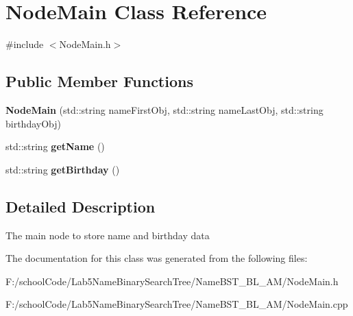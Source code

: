 \hypertarget{class_node_main}{}\section{Node\+Main Class Reference}
\label{class_node_main}


{\ttfamily \#include $<$Node\+Main.\+h$>$}

\subsection*{Public Member Functions}
\begin{DoxyCompactItemize}
\item 
\mbox{\label{class_node_main_a61c13db0781ce67d40c980dc5e5167e8}} 
{\bfseries Node\+Main} (std\+::string name\+First\+Obj, std\+::string name\+Last\+Obj, std\+::string birthday\+Obj)
\item 
\mbox{\label{class_node_main_ab2a322039546740a6ee4dc889c1af6ce}} 
std\+::string {\bfseries get\+Name} ()
\item 
\mbox{\label{class_node_main_a92b3f0b8de146421da6067f5272135d8}} 
std\+::string {\bfseries get\+Birthday} ()
\end{DoxyCompactItemize}


\subsection{Detailed Description}
The main node to store name and birthday data 

The documentation for this class was generated from the following files\+:\begin{DoxyCompactItemize}
\item 
F\+:/school\+Code/\+Lab5\+Name\+Binary\+Search\+Tree/\+Name\+B\+S\+T\+\_\+\+B\+L\+\_\+\+A\+M/Node\+Main.\+h\item 
F\+:/school\+Code/\+Lab5\+Name\+Binary\+Search\+Tree/\+Name\+B\+S\+T\+\_\+\+B\+L\+\_\+\+A\+M/Node\+Main.\+cpp\end{DoxyCompactItemize}
